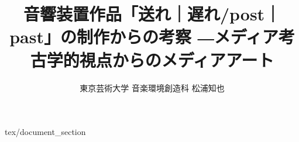 \documentclass[report]{jsbook}
\title {音響装置作品「送れ｜遅れ/post｜past」の制作からの考察 ―メディア考古学的視点からのメディアアート}
\author {東京芸術大学 音楽環境創造科 松浦知也}
\begin{document}
\maketitle

\tableofcontents

 {tex/document_section}


\printbibliography[title = 参考文献]
\end{document}
